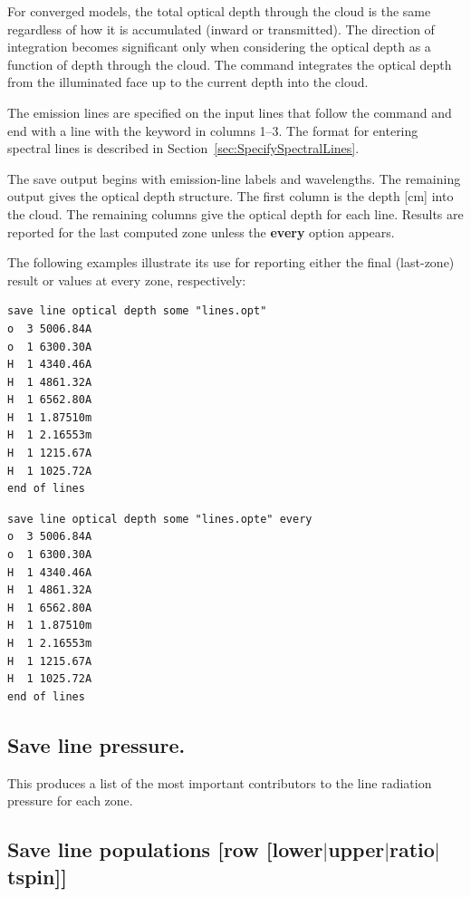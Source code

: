 For converged models, the total optical depth through the cloud is the same
regardless of how it is accumulated (inward or transmitted).
The direction of integration becomes significant only when
considering the optical depth as a function of depth through
the cloud.
The command integrates the optical depth from
the illuminated face up to the current depth into the cloud.

The emission lines are specified on the input lines that follow the
command and end with a line with the keyword  in columns 1--3.
The format for entering spectral lines is described in Section~\ref{sec:SpecifySpectralLines}.

The save output begins with emission-line labels and wavelengths.  The
remaining output gives the optical depth structure.  The first column is the
depth [cm] into the cloud.  The remaining columns give the optical depth for each line.  Results are reported for the last computed zone unless the \textbf{every} option appears.

The following examples illustrate its use for reporting either the final (last-zone) result or values at every zone, respectively:

\begin{verbatim}
save line optical depth some "lines.opt"
o  3 5006.84A
o  1 6300.30A
H  1 4340.46A
H  1 4861.32A
H  1 6562.80A 
H  1 1.87510m
H  1 2.16553m 
H  1 1215.67A
H  1 1025.72A
end of lines
\end{verbatim}

\begin{verbatim}
save line optical depth some "lines.opte" every
o  3 5006.84A
o  1 6300.30A
H  1 4340.46A
H  1 4861.32A
H  1 6562.80A 
H  1 1.87510m
H  1 2.16553m 
H  1 1215.67A
H  1 1025.72A
end of lines
\end{verbatim}

\subsection{Save line pressure.}

This produces a list of the most important contributors to the line
radiation pressure for each zone.

\subsection{Save line populations
        [row [lower$\vert$upper$\vert$ratio$\vert$tspin]]}
\label{sec:CommandSaveHyperfinePops}

